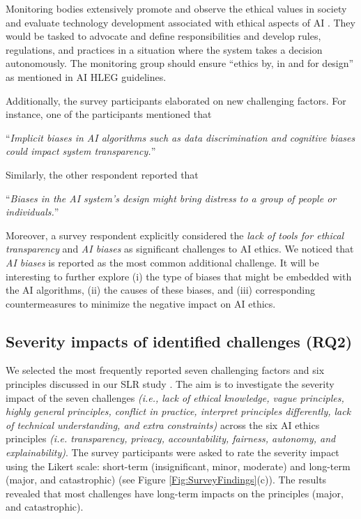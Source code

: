 Monitoring bodies extensively promote and observe the ethical values in society and evaluate technology development associated with ethical aspects of AI \cite{AR2}. They would be tasked to advocate and define responsibilities and develop rules, regulations, and practices in a situation where the system takes a decision autonomously. The monitoring group should ensure “ethics by, in and for design” as mentioned in AI HLEG \cite{AR2} guidelines. 

Additionally, the survey participants elaborated on new challenging factors. For instance, one of the participants mentioned that 

\faComment{}  “\textit{Implicit biases in AI algorithms such as data discrimination and cognitive biases could impact system transparency.}” 

Similarly, the other respondent reported that 

\faComment{} “\textit{Biases in the AI system’s design might bring distress to a group of people or individuals.}” 

Moreover, a survey respondent explicitly considered the \textit{lack of tools for ethical transparency} and \textit{AI biases} as significant challenges to AI ethics. We noticed that \textit{AI biases} is reported as the most common additional challenge. It will be interesting to further explore (i) the type of biases that might be embedded with the AI algorithms, (ii) the causes of these biases, and (iii) corresponding countermeasures to minimize the negative impact on AI ethics.

\subsection{Severity impacts of identified challenges (RQ2)} \label{sec:Severity impacts of identified challenges (RQ2)}

We selected the most frequently reported seven challenging factors and six principles discussed in our SLR study \cite{AR13}. The aim is to investigate the severity impact of the seven challenges \textit{(i.e., lack of ethical knowledge, vague principles, highly general principles, conflict in practice, interpret principles differently, lack of technical understanding, and extra constraints)} across the six AI ethics principles \textit{(i.e. transparency, privacy, accountability, fairness, autonomy, and explainability)}. The survey participants were asked to rate the severity impact using the Likert scale: short-term (insignificant, minor, moderate) and long-term (major, and catastrophic)  (see Figure \ref{Fig:SurveyFindings}(c)). The results revealed that most challenges have long-term impacts on the principles (major, and catastrophic). 

